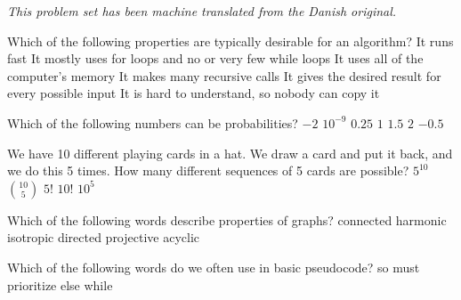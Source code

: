 \noindent\emph{This problem set has been machine translated from the Danish original.}
\medskip

\multiplechoicestart


Which of the following properties are typically desirable for an algorithm?
\multipleanswers
\optionsstart
\answer It runs fast \correct
\answer It mostly uses for loops and no or very few while loops
\answer It uses all of the computer's memory
\answer It makes many recursive calls
\answer It gives the desired result for every possible input \correct
\answer It is hard to understand, so nobody can copy it
\optionsend
{}

Which of the following numbers can be probabilities?
\multipleanswers
\optionsstart
\answer $-2$
\answer $10^{-9}$ \correct
\answer $0.25$ \correct
\answer $1$ \correct
\answer $1.5$
\answer $2$
\answer $-0.5$
\optionsend
{}

We have 10 different playing cards in a hat. We draw a card and put it back, and we do this 5 times. How many different sequences of 5 cards are possible?
\oneanswer
\optionsstart
\answer $5^{10}$
\answer $\binom{10}{5}$
\answer $5!$
\answer $10!$
\answer $10^5$ \correct
\optionsend
{}

Which of the following words describe properties of graphs?
\multipleanswers
\optionsstart
\answer connected \correct
\answer harmonic
\answer isotropic
\answer directed \correct
\answer projective
\answer acyclic \correct
\optionsend
{}


Which of the following words do we often use in basic pseudocode?
\multipleanswers
\optionsstart
\answer so
\answer must
\answer prioritize
\answer else \correct
\answer while \correct
\optionsend
{}


